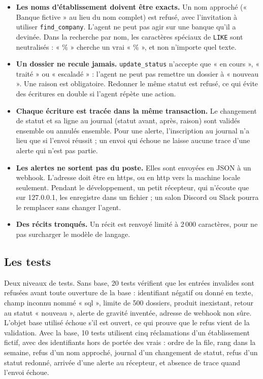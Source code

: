 \documentclass[11pt,a4paper]{article}
\begin{document}
\begin{itemize}
  \item \textbf{Les noms d'établissement doivent être exacts.} Un nom approché (« Banque fictive » au lieu du nom complet) est refusé, avec l'invitation à utiliser \texttt{find\_company}. L'agent ne peut pas agir sur une banque qu'il a devinée. Dans la recherche par nom, les caractères spéciaux de \texttt{LIKE} sont neutralisés : « \% » cherche un vrai « \% », et non n'importe quel texte.
  \item \textbf{Un dossier ne recule jamais.} \texttt{update\_status} n'accepte que « en cours », « traité » ou « escaladé » : l'agent ne peut pas remettre un dossier à « nouveau ». Une raison est obligatoire. Redonner le même statut est refusé, ce qui évite des écritures en double si l'agent répète une action.
  \item \textbf{Chaque écriture est tracée dans la même transaction.} Le changement de statut et sa ligne au journal (statut avant, après, raison) sont validés ensemble ou annulés ensemble. Pour une alerte, l'inscription au journal n'a lieu que si l'envoi réussit ; un envoi qui échoue ne laisse aucune trace d'une alerte qui n'est pas partie.
  \item \textbf{Les alertes ne sortent pas du poste.} Elles sont envoyées en JSON à un webhook. L'adresse doit être en https, ou en http vers la machine locale seulement. Pendant le développement, un petit récepteur, qui n'écoute que sur 127.0.0.1, les enregistre dans un fichier ; un salon Discord ou Slack pourra le remplacer sans changer l'agent.
  \item \textbf{Des récits tronqués.} Un récit est renvoyé limité à 2\,000 caractères, pour ne pas surcharger le modèle de langage.
\end{itemize}

\subsection{Les tests}

Deux niveaux de tests. Sans base, 20 tests vérifient que les entrées invalides sont refusées avant toute ouverture de la base : identifiant négatif ou donné en texte, champ inconnu nommé « sql », limite de 500 dossiers, produit inexistant, retour au statut « nouveau », alerte de gravité inventée, adresse de webhook non sûre. L'objet base utilisé échoue s'il est ouvert, ce qui prouve que le refus vient de la validation. Avec la base, 10 tests utilisent cinq réclamations d'un établissement fictif, avec des identifiants hors de portée des vrais : ordre de la file, rang dans la semaine, refus d'un nom approché, journal d'un changement de statut, refus d'un statut redonné, arrivée d'une alerte au récepteur, et absence de trace quand l'envoi échoue.
\end{document}
